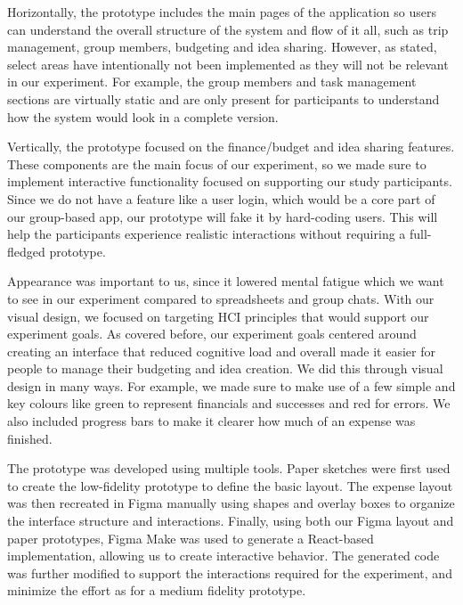 \documentclass[12pt,a4paper]{article}
\begin{document}
Horizontally, the prototype includes the main pages of the application so users can understand the overall structure of the system and flow of it all, such as trip management, group members, budgeting and idea sharing. However, as stated, select areas have intentionally not been implemented as they will not be relevant in our experiment. For example, the group members and task management sections are virtually static and are only present for participants to understand how the system would look in a complete version. \newline

Vertically, the prototype focused on the finance/budget and idea sharing features. These components are the main focus of our experiment, so we made sure to implement interactive functionality focused on supporting our study participants. Since we do not have a feature like a user login, which would be a core part of our group-based app, our prototype will fake it by hard-coding users. This will help the participants experience realistic interactions without requiring a full-fledged prototype. \newline
 
Appearance was important to us, since it lowered mental fatigue which we want to see in our experiment compared to spreadsheets and group chats. With our visual design, we focused on targeting HCI principles that would support our experiment goals. As covered before, our experiment goals centered around creating an interface that reduced cognitive load and overall made it easier for people to manage their budgeting and idea creation. We did this through visual design in many ways. For example, we made sure to make use of a few simple and key colours like green to represent financials and successes and red for errors. We also included progress bars to make it clearer how much of an expense was finished. \newline 

The prototype was developed using multiple tools. Paper sketches were first used to create the low-fidelity prototype to define the basic layout. The expense layout was then recreated in Figma manually using shapes and overlay boxes to organize the interface structure and interactions. Finally, using both our Figma layout and paper prototypes, Figma Make was used to generate a React-based implementation, allowing us to create interactive behavior. The generated code was further modified to support the interactions required for the experiment, and minimize the effort as for a medium fidelity prototype.  \newline
\end{document}
